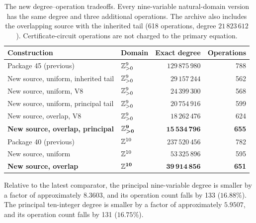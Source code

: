 \begin{table}[htbp]
\centering\small
\begin{tabular}{@{}llrr@{}}
\toprule Construction & Domain & Exact degree & Operations\\\midrule
Package 45 (previous) & $\mathbb Z_{>0}^9$ & $129\,875\,980$ & 788\\
New source, uniform, inherited tail & $\mathbb Z_{>0}^9$ & $29\,157\,244$ & 562\\
New source, uniform, V8 & $\mathbb Z_{>0}^9$ & $24\,399\,300$ & 568\\
New source, uniform, principal tail & $\mathbb Z_{>0}^9$ & $20\,754\,916$ & 599\\
New source, overlap, V8 & $\mathbb Z_{>0}^9$ & $18\,262\,476$ & 624\\
\textbf{New source, overlap, principal} & $\boldsymbol{\mathbb Z_{>0}^9}$ & $\mathbf{15\,534\,796}$ & \textbf{655}\\\midrule
Package 40 (previous) & $\mathbb Z^{10}$ & $237\,520\,456$ & 782\\
New source, uniform & $\mathbb Z^{10}$ & $53\,325\,896$ & 595\\
\textbf{New source, overlap} & $\boldsymbol{\mathbb Z^{10}}$ & $\mathbf{39\,914\,856}$ & \textbf{651}\\
\bottomrule
\end{tabular}
\caption{The new degree--operation tradeoffs. Every nine-variable natural-domain
version has the same degree and three additional operations. The archive also
includes the overlapping source with the inherited tail (618 operations,
degree $21\,823\,612$). Certificate-circuit operations are not charged to
the primary equation.}
\end{table}

Relative to the latest comparator, the principal nine-variable degree is
smaller by a factor of approximately $8.3603$, and its operation count falls
by 133 ($16.88\%$). The principal ten-integer degree is smaller by a factor
of approximately $5.9507$, and its operation count falls by 131 ($16.75\%$).
